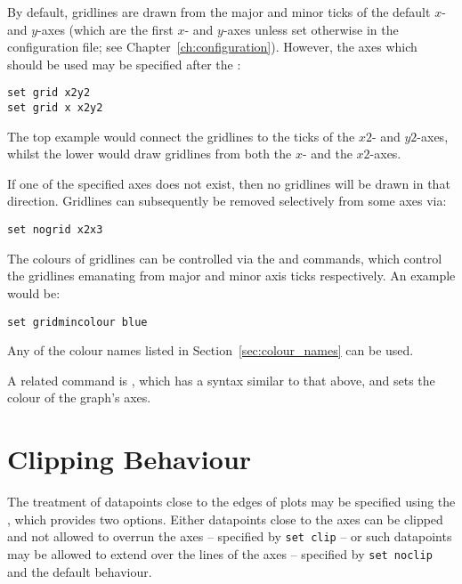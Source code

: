 \noindent By default, gridlines are drawn from the major and minor ticks of the
default $x$- and $y$-axes (which are the first $x$- and $y$-axes unless set
otherwise in the configuration file; see Chapter~\ref{ch:configuration}).
However, the axes which should be used may be specified after the :

\begin{verbatim}
set grid x2y2
set grid x x2y2
\end{verbatim}

\noindent The top example would connect the gridlines to the ticks of the $x2$-
and $y2$-axes, whilst the lower would draw gridlines from both the $x$- and the
$x2$-axes.

If one of the specified axes does not exist, then no gridlines will be drawn in
that direction.  Gridlines can subsequently be removed selectively from some
axes via:

\begin{verbatim}
set nogrid x2x3
\end{verbatim}

The colours of gridlines can be
controlled via the  and  commands, which control the gridlines emanating from major and
minor axis ticks respectively. An example would be:

\begin{verbatim}
set gridmincolour blue
\end{verbatim}

\noindent Any of the colour names listed in Section~\ref{sec:colour_names} can
be used.

A related command is , which has a syntax similar to that above, and sets the colour of
the graph's axes.\label{sec:set_colours}

\section{Clipping Behaviour}

The treatment of datapoints close to the edges of plots may be specified using
the , which provides two options. Either datapoints close to
the axes can be clipped and not allowed to overrun the axes -- specified by
{\tt set clip} -- or such datapoints may be allowed to extend over the lines of
the axes -- specified by {\tt set noclip} and the default behaviour.


